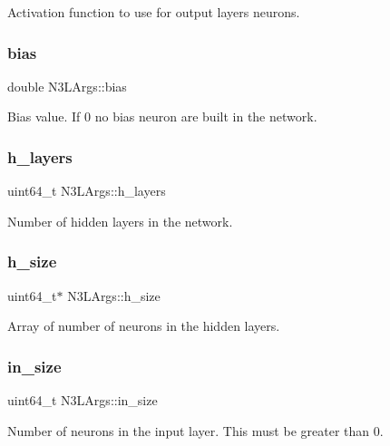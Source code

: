 Activation function to use for output layer\textquotesingle{}s neurons. \mbox{\label{structN3LArgs_ad51d108eba4b55f7fc49174724fbacad}} 
\subsubsection{\texorpdfstring{bias}{bias}}
{\footnotesize\ttfamily double N3\+L\+Args\+::bias}

Bias value. If 0 no bias neuron are built in the network. \mbox{\label{structN3LArgs_acbb947695cd6db88658a2a6fa78c1682}} 
\subsubsection{\texorpdfstring{h\+\_\+layers}{h\_layers}}
{\footnotesize\ttfamily uint64\+\_\+t N3\+L\+Args\+::h\+\_\+layers}

Number of hidden layers in the network. \mbox{\label{structN3LArgs_ae875ef755586a29387def48249c98d81}} 
\subsubsection{\texorpdfstring{h\+\_\+size}{h\_size}}
{\footnotesize\ttfamily uint64\+\_\+t$\ast$ N3\+L\+Args\+::h\+\_\+size}

Array of number of neurons in the hidden layers. \mbox{\label{structN3LArgs_afbd19ab7f7afe11e440f46d293a0f6dc}} 
\subsubsection{\texorpdfstring{in\+\_\+size}{in\_size}}
{\footnotesize\ttfamily uint64\+\_\+t N3\+L\+Args\+::in\+\_\+size}

Number of neurons in the input layer. This must be greater than 0. \mbox{\label{structN3LArgs_a63bb20896b0af109ea281998e5fd56ab}} 
